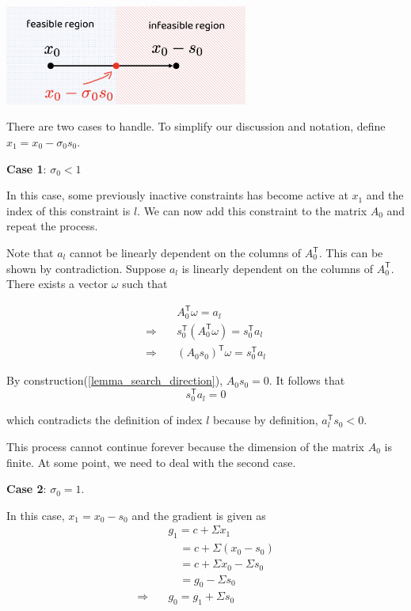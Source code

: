 \documentclass[letterpaper, oneside]{book}
\theoremstyle{definition}
\theoremstyle{remark}
\begin{document}
\begin{center}
	\includegraphics[width=0.6\textwidth]{maximum_step_size.png}
\end{center}

There are two cases to handle. To simplify our discussion and notation, define $x_1 = x_0 - \sigma_0 s_0$.

\textbf{Case 1}: $\sigma_0 < 1$

In this case, some previously inactive constraints has become active at $x_1$ and the index of this constraint is $l$. We can now add this constraint to the matrix $A_0$ and repeat the process. 

Note that $a_l$ cannot be linearly dependent on the columns of $A_0^{\mathsf{T}}$. This can be shown by contradiction. Suppose $a_l$ is linearly dependent on the columns of $A_0^{\mathsf{T}}$. There exists a vector $\omega$ such that

\begin{align*}
	& A_0^{\mathsf{T}} \omega  = a_l \\
	\Rightarrow \quad & s_0^{\mathsf{T}}(A_0^{\mathsf{T}} \omega) = s_0^{\mathsf{T}} a_l \\
	\Rightarrow \quad & (A_0 s_0)^{\mathsf{T}} \omega  = s_0^{\mathsf{T}} a_l
\end{align*}

By construction(\ref{lemma_search_direction}), $A_0 s_0 = 0$. It follows that
\[ 
	s_0^{\mathsf{T}} a_l = 0
\] 

which contradicts the definition of index $l$ because by definition, $a_l^{\mathsf{T}}s_0 < 0$.

This process cannot continue forever because the dimension of the matrix $A_0$ is finite. At some point, we need to deal with the second case.

\textbf{Case 2}: $\sigma_0 = 1$.

In this case, $x_1 = x_0 - s_0$ and the gradient is given as
\begin{align*}
	& g_1 = c + \Sigma x_1 \\
	& \quad = c + \Sigma (x_0 - s_0) \\
	& \quad = c + \Sigma x_0 - \Sigma s_0 \\
	& \quad = g_0 - \Sigma s_0 \\	
	\Rightarrow \quad & g_0  =  g_1 + \Sigma s_0
\end{align*}
\end{document}
